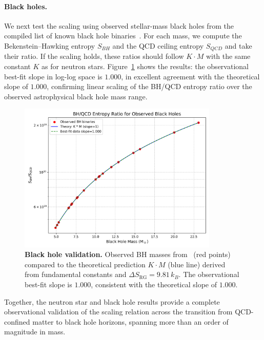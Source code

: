 \documentclass[aps,prd,onecolumn,nofootinbib,superscriptaddress]{revtex4-2}
\begin{document}
\paragraph{Black holes.}
We next test the scaling using observed stellar-mass black holes from the compiled list of known black hole binaries~\cite{Wiktorowicz_Belczynski_BHcatalog}. 
For each mass, we compute the Bekenstein--Hawking entropy $S_{BH}$ and the QCD ceiling entropy $S_{QCD}$ and take their ratio. 
If the scaling holds, these ratios should follow $K \cdot M$ with the same constant $K$ as for neutron stars.
Figure~\ref{fig:bhcatalog} shows the results: the observational best-fit slope in log-log space is $1.000$, in excellent agreement with the theoretical slope of $1.000$, confirming linear scaling of the BH/QCD entropy ratio over the observed astrophysical black hole mass range.

\begin{figure}[htbp]
\centering
\includegraphics[width=0.85\textwidth]{figures/bh_catalog_validation.png}
\caption{\textbf{Black hole validation.} 
Observed BH masses from~\cite{Wiktorowicz_Belczynski_BHcatalog} (red points) compared to the theoretical prediction $K \cdot M$ (blue line) derived from fundamental constants and $\Delta S_{\mathrm{RG}} = 9.81\,k_B$. 
The observational best-fit slope is $1.000$, consistent with the theoretical slope of $1.000$.}
\label{fig:bhcatalog}
\end{figure}

Together, the neutron star and black hole results provide a complete observational validation of the scaling relation across the transition from QCD-confined matter to black hole horizons, spanning more than an order of magnitude in mass.
\end{document}
